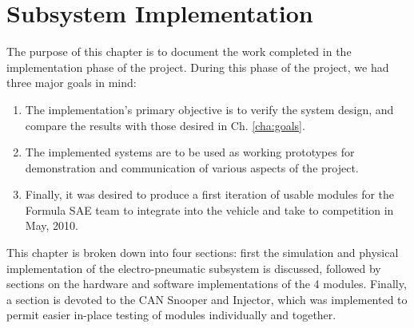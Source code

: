 \chapter{Subsystem Implementation\label{cha:implementation}}

The purpose of this chapter is to document the work completed in the implementation phase of the project. During this phase of the project, we had three major goals in mind:
\begin{enumerate}
  \item The implementation's primary objective is to verify the system design, and compare the results with those desired in Ch. \ref{cha:goals}.
  \item The implemented systems are to be used as working prototypes for demonstration and communication of various aspects of the project.
  \item Finally, it was desired to produce a first iteration of usable modules for the Formula SAE team to integrate into the vehicle and take to competition in May, 2010.
\end{enumerate}

This chapter is broken down into four sections: first the simulation and physical implementation of the electro-pneumatic subsystem is discussed, followed by sections on the hardware and software implementations of the 4 modules. Finally, a section is devoted to the CAN Snooper and Injector, which was implemented to permit easier in-place testing of modules individually and together.







